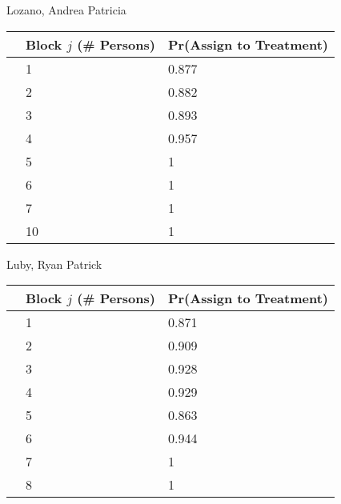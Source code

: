 \documentclass[11pt,notitlepage]{article}
\begin{document}
\begin{table}[h!]
\begin{center}
\begin{minipage}[t]{0.45\linewidth}\centering

Lozano, Andrea Patricia

\begin{tabular}{rll}
  \hline
 & Block $j$ (\# Persons) & Pr(Assign to Treatment) \\ 
  \hline
  & 1 & 0.877 \\ 
  & 2 & 0.882 \\ 
  & 3 & 0.893 \\ 
  & 4 & 0.957 \\ 
  & 5 & 1 \\ 
  & 6 & 1 \\ 
  & 7 & 1 \\ 
  & 10 & 1 \\ 
   \hline
\end{tabular}

\end{minipage}
\hspace{0.5cm}
\begin{minipage}[t]{0.45\linewidth}\centering

Luby, Ryan Patrick

\begin{tabular}{rll}
  \hline
 & Block $j$ (\# Persons) & Pr(Assign to Treatment) \\ 
  \hline
 & 1 & 0.871 \\ 
 & 2 & 0.909 \\ 
 & 3 & 0.928 \\ 
 & 4 & 0.929 \\ 
 & 5 & 0.863 \\ 
 & 6 & 0.944 \\ 
 & 7 & 1 \\ 
 & 8 & 1 \\ 
   \hline
\end{tabular}

\end{minipage}

\end{center}
\end{table}
\end{document}
